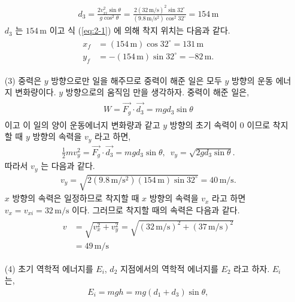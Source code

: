 \documentclass[floatfix,nofootinbib,superscriptaddress,fleqn]{revtex4-2}
\begin{document}
\begin{itemize}
  \begin{align}\label{eq:2-2}
    d_3 = \frac{2v^2_{xi}\sin{\theta}}{g\cos^2{\theta}}
    =\frac{2(32\,\mathrm{m/s})^2\sin{32^\circ}}
    {(9.8\,\mathrm{m/s^2})\cos^2{32^\circ}}
    =154\,\mathrm{m}
  \end{align}
  $d_3$ 는 $154\,\mathrm{m}$ 이고 식 (\ref{eq:2-1}) 에 의해
   착지 위치는 다음과 같다.
\begin{align}
  \begin{split}\label{eq:2-3}
    x_f &= (154\,\mathrm{m})\cos{32^\circ}=131\,\mathrm{m} \\
    y_f &= -(154\,\mathrm{m})\sin{32^\circ}=-82\,\mathrm{m}.
  \end{split}
\end{align}
  \item[(3)] 중력은 $y$ 방향으로만 일을 해주므로 중력이 해준 일은 모두 $y$ 방향의 
  운동 에너지 변화량이다. $y$ 방향으로의 움직임 만을 생각하자. 
  중력이 해준 일은,
  \begin{align}
    \begin{split}
      W = \vec{F_g}\cdot\vec{d_3}=mgd_3\sin{\theta}
    \end{split}
  \end{align}
  이고 이 일의 양이 운동에너지 변화량과 같고 $y$ 방향의 초기 속력이 0 이므로
  착지할 때 $y$ 방향의 속력을 $v_y$ 라고 하면,
  \begin{align}
    \frac{1}{2}mv_y^2=\vec{F_g}\cdot\vec{d_3}=mgd_3\sin{\theta},\,\,\,
    v_y = \sqrt{2gd_3\sin{\theta}}.
  \end{align}
  따라서 $v_y$ 는 다음과 같다.
  \begin{align}
    v_y = \sqrt{2(9.8\,\mathrm{m/s^2})(154\,\mathrm{m})\sin{32^\circ}}
      =40\,\mathrm{m/s}.
  \end{align}
  $x$ 방향의 속력은 일정하므로 착지할 때 $x$ 방향의 속력을 $v_x$ 라고 하면
   $v_x=v_{xi}=32\,\mathrm{m/s}$ 이다. 그러므로 착지할 때의 속력은 다음과 같다.
   \begin{align}
    \begin{split}
      v &= \sqrt{v_x^2+v_y^2} 
      = \sqrt{(32\,\mathrm{m/s})^2+(37\,\mathrm{m/s})^2}  \\
      &=49\,\mathrm{m/s}
    \end{split}
   \end{align}
  \item[(4)] 초기 역학적 에너지를 $E_i$, 
  $d_2$ 지점에서의 역학적 에너지를 $E_2$ 라고 하자. $E_i$ 는,
  \begin{align}
    E_i = mgh =mg\left(d_1+d_3\right)\sin{\theta},

\end{align}
\end{itemize}
\end{document}
